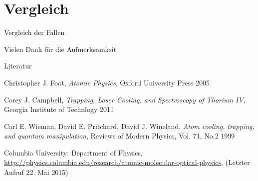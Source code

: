 \documentclass[12pt,xcolor=dvipsnames]{beamer}
\begin{document}
\section{Vergleich}

\begin{frame}{Vergleich der Fallen}
	
	
\end{frame}

\begin{frame}{Vielen Dank für die Aufmerksamkeit}
\end{frame}

\begin{frame}{Literatur}
	\begin{thebibliography}{9}
		Christopher J. Foot,
		\emph{Atomic Physics},
		Oxford University Press 2005
		
		Corey J. Campbell,
		\emph{Trapping, Laser Cooling, and Spectroscopy of Thorium IV},
		Georgia Institute of Technlogy 2011
		
		Carl E. Wieman, David E. Pritchard, David J. Wineland,
		\emph{Atom cooling, trapping, and quantum manipulation},
		Reviews of Modern Physics, Vol. 71, No.2 1999
		
		Columbia University: Department of Physics,
		\url{http://physics.columbia.edu/research/atomic-molecular-optical-physics},
		(Letzter Aufruf 22. Mai 2015)
		
		
	\end{thebibliography}
	
\end{frame}
\end{document}
